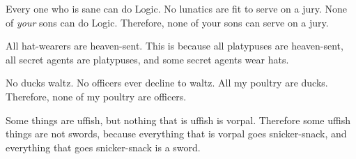 {\begin{exercises}
\item \label{itm:sons} Every one who is sane can do Logic. No lunatics are fit to serve on a jury. None of \textit{your} sons can do Logic. Therefore, none of your sons can serve on a jury.


\item All hat-wearers are heaven-sent. This is because all platypuses are heaven-sent, all secret agents are platypuses, and some secret agents wear hats. 



\item \label{itm:ducks} No ducks waltz. No officers ever decline to waltz. All my poultry are ducks. Therefore, none of my poultry are officers.




\item Some things are uffish, but nothing that is uffish is vorpal. Therefore some uffish things are not swords, because everything that is vorpal goes snicker-snack, and everything that goes snicker-snack is a sword. 





\end{exercises}}
